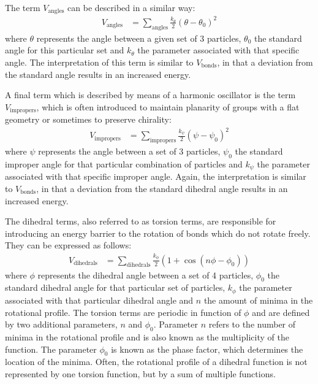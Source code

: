 \documentclass[conference]{IEEEtran}
\begin{document}
The term $V_{\mathrm{angles}}$ can be described in a similar way:
\begin{equation}
    \begin{aligned}
    V_{\mathrm{angles}} &= \sum_{\mathrm{angles}} \frac{k_{\theta}}{2}{(\theta-\theta_0)}^2
    \end{aligned}
\end{equation}
where $\theta$ represents the angle between a given set of 3 particles, $\theta_{0}$ the standard angle for this 
particular set and $k_{\theta}$ the parameter associated with that specific angle. The interpretation of this 
term is similar to $V_{\mathrm{bonds}}$, in that a deviation from the standard angle results in an increased energy.

A final term which is described by means of a harmonic oscillator is the term $V_{\mathrm{impropers}}$, which is 
often introduced to  maintain planarity of groups with a flat geometry or sometimes to preserve chirality:
\begin{equation}
    \begin{aligned}
    V_{\mathrm{impropers}} &= \sum_{\mathrm{impropers}} \frac{k_{\psi}}{2}{(\psi-\psi_0)}^2
    \end{aligned}
\end{equation}
where $\psi$ represents the angle between a set of 3 particles, $\psi_0$ the standard improper angle for that 
particular combination of particles and $k_{\psi}$ the parameter associated with that specific improper angle. 
Again, the interpretation is similar to $V_{\mathrm{bonds}}$, in that a deviation from the standard dihedral 
angle results in an increased energy.

The dihedral terms, also referred to as torsion terms, are responsible for introducing an energy barrier to the 
rotation of bonds which do not rotate freely. They can be expressed as follows:
\begin{equation}
    \begin{aligned}
    V_{\mathrm{dihedrals}} &= \sum_{\mathrm{dihedrals}} \frac{k_{\phi}}{2}(1+\cos(n\phi-\phi_0))
    \end{aligned}
\end{equation}
where $\phi$ represents the dihedral angle between a set of 4 particles, $\phi_0$ the standard dihedral angle for 
that particular set of particles, $k_{\phi}$ the parameter associated with that particular dihedral angle and $n$ 
the amount of minima in the rotational profile. The torsion terms are periodic in function of $\phi$ and are 
defined by two additional parameters, $n$ and $\phi_0$. Parameter $n$ refers to the number of minima in the 
rotational profile and is also known as the multiplicity of the function. The parameter $\phi_0$ is known as 
the phase factor, which determines the location of the minima. Often, the rotational profile of a dihedral 
function is not represented by one torsion function, but by a sum of multiple functions. 
\end{document}
